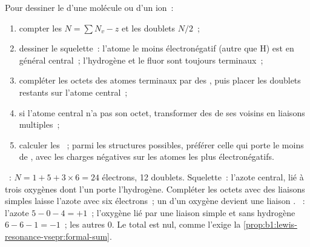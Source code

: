 \begin{method}\label{met:b1:lewis-resonance-vsepr:lewis}
Pour dessiner le  d'une molécule ou d'un ion~:
\begin{enumerate}
  \item compter les  $N = \sum N_v - z$ et les
        doublets $N/2$~;
  \item dessiner le squelette~: l'atome le moins électronégatif (autre que
        H) est en général central~; l'hydrogène et le fluor sont toujours
        terminaux~;
  \item compléter les octets des atomes terminaux par des , puis placer les doublets restants sur l'atome central~;
  \item si l'atome central n'a pas son octet, transformer des  de ses voisins en liaisons multiples~;
  \item calculer les ~; parmi les structures possibles,
        préférer celle qui porte le moins de , avec les
        charges négatives sur les atomes les plus électronégatifs.
\end{enumerate}
\end{method}

\begin{example}\label{ex:b1:lewis-resonance-vsepr:hno3}
~: $N = 1 + 5 + 3 \times 6 = 24$ électrons, 12 doublets.
Squelette~: l'azote central, lié à trois oxygènes dont l'un porte
l'hydrogène. Compléter les octets avec des liaisons simples laisse
l'azote avec six électrons~; un  d'un oxygène devient
une liaison . ~: l'azote $5 - 0 - 4 = +1$~;
l'oxygène lié par une liaison simple et sans hydrogène $6 - 6 - 1 = -1$~;
les autres 0. Le total est nul, comme l'exige la
\cref{prop:b1:lewis-resonance-vsepr:formal-sum}.
\end{example}

